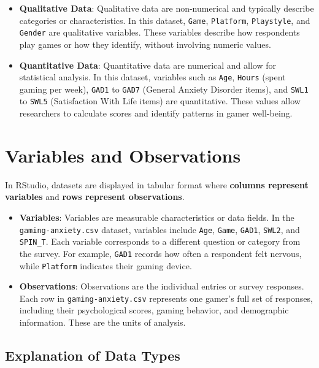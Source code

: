 \documentclass[
]{book}
\begin{document}
\begin{itemize}
\item
  \textbf{Qualitative Data}: Qualitative data are non-numerical and typically describe categories or characteristics. In this dataset, \texttt{Game}, \texttt{Platform}, \texttt{Playstyle}, and \texttt{Gender} are qualitative variables. These variables describe how respondents play games or how they identify, without involving numeric values.
\item
  \textbf{Quantitative Data}: Quantitative data are numerical and allow for statistical analysis. In this dataset, variables such as \texttt{Age}, \texttt{Hours} (spent gaming per week), \texttt{GAD1} to \texttt{GAD7} (General Anxiety Disorder items), and \texttt{SWL1} to \texttt{SWL5} (Satisfaction With Life items) are quantitative. These values allow researchers to calculate scores and identify patterns in gamer well-being.
\end{itemize}

\section{Variables and Observations}\label{variables-and-observations}

In RStudio, datasets are displayed in tabular format where \textbf{columns represent variables} and \textbf{rows represent observations}.

\begin{itemize}
\item
  \textbf{Variables}: Variables are measurable characteristics or data fields. In the \texttt{gaming-anxiety.csv} dataset, variables include \texttt{Age}, \texttt{Game}, \texttt{GAD1}, \texttt{SWL2}, and \texttt{SPIN\_T}. Each variable corresponds to a different question or category from the survey. For example, \texttt{GAD1} records how often a respondent felt nervous, while \texttt{Platform} indicates their gaming device.
\item
  \textbf{Observations}: Observations are the individual entries or survey responses. Each row in \texttt{gaming-anxiety.csv} represents one gamer's full set of responses, including their psychological scores, gaming behavior, and demographic information. These are the units of analysis.
\end{itemize}

\subsection*{Explanation of Data Types}\label{explanation-of-data-types}
\end{document}

